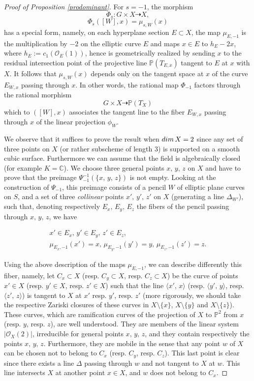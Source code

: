 \documentclass[10pt,a4paper]{amsart}
\begin{document}
\begin{proof}[Proof of Proposition \ref{prodominant}] For $s=-1$, the morphism
$$\Phi_s: G\times X\dashrightarrow X,$$
$$\Phi_s([W],x)=\mu_{s,W}(x)$$
has a special form, namely,  on each hyperplane section $E\subset X$, the map $\mu_{E,-1}$ is the multiplication by $-2$ on the elliptic curve $E$ and  maps $x\in E$ to
$h_E-2x$, where $h_E:=c_1(\mathcal{O}_E(1))$, hence is geometrically realized by sending $x$ to the residual intersection point of the projective  line
$\mathbb{P}(T_{E,x})$ tangent to $E$ at $x$ with $X$. It follows that $\mu_{s,W}(x)$ depends only on the tangent space at $x$ of the curve $E_{W,x}$ passing through $x$. In other words, the rational map $\Phi_{-1}$ factors
  through the rational morphism
$$ G\times X\dashrightarrow\mathbb{P}(T_X)$$
which to $([W], x)$ associates the tangent line to the fiber $E_{W,x}$ passing through $x$  of the linear projection $\phi_W$.

We observe that it suffices to prove the result when  ${\rm dim}\,X=2$ since any set of three points on $X$ (or rather subscheme of length $3$) is supported on a smooth cubic surface.
Furthermore we can assume that the field is algebraically closed (for example $K=\mathbb{C}$). We choose three  general points $x,\,y,\,z$ on $X$ and have to prove that the preimage
$\Psi_{-1}^{-1}(\{x,\,y,\,z\})$ is not empty.
Looking at the construction of $\Psi_{-1}$, this preimage consists of a pencil $W$ of elliptic plane curves on $S$, and a set of three {\it collinear} points $x',\,y',\,z'$ on $X$ (generating a line $\Delta_{W'}$), such that, denoting respectively
$E_x,\,E_y,\,E_z$ the fibers of the pencil passing through $x,\,y,\,z$, we have

\begin{eqnarray}\label{eqpointcourbe} x'\in E_x,\,y'\in E_y,\,z'\in E_z,\\
\label{eqpointmultmoinsun}\mu_{E_x,-1}(x')=x,\, \mu_{E_y,-1}(y')=y,\,\mu_{E_z,-1}(z')=z.\end{eqnarray}


Using the above description of the maps $\mu_{E,-1}$, we can describe differently this fiber, namely, let
$C_x\subset X$ (resp. $C_y\subset X$, resp. $C_z\subset X$) be the curve of points $x'\in X$ (resp. $y'\in X$, resp. $z'\in X$)  such that the line
$\langle x',\,x\rangle$ (resp. $\langle y',\,y\rangle$, resp. $\langle z',\,z\rangle$) is tangent to $X$ at $x'$  resp. $y'$, resp. $z'$ (more rigorously, we should take the respective Zariski closures of these curves in $X\setminus \{x\}$,  $X\setminus \{y\}$ and $X\setminus \{z\}$). These curves, which are ramification curves of the projection of $X$ to $\mathbb{P}^2$  from $x$ (resp. $y$, resp. $z$), are well understood. They are members of the linear system  $|\mathcal{O}_X(2)|$, irreducible for general points $x,\,y,\,z$, and they contain respectively the points $x,\,y,\,z$. Furthermore, they are mobile in the sense that  any point $w$ of $X$ can be chosen not to belong to $C_x$ (resp. $C_y$, resp. $C_z$). This last point is clear since there exists a line $\Delta$ passing through $w$ and not tangent to $X$ at $w$. This line intersects $X$ at another point $x\in X$, and $w$ does not belong to $C_x$.


\end{proof}
\end{document}
